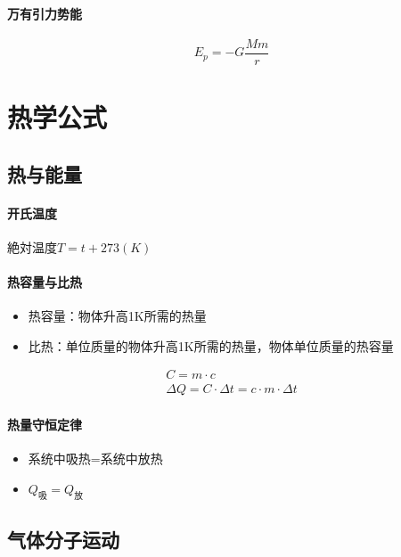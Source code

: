\paragraph{万有引力势能}
\begin{equation*}
    E_p=-G\frac{Mm}{r}
\end{equation*}

\section{热学公式}

\subsection{热与能量}

\paragraph{开氏温度}
\begin{center}
    絶対温度$T=t+273(K)$
\end{center}

\paragraph{热容量与比热}
\begin{itemize}
    \item 热容量：物体升高1K所需的热量
    \item 比热：单位质量的物体升高1K所需的热量，物体单位质量的热容量
\end{itemize}
\begin{gather*}
    C=m\cdot c\\
    \Delta Q=C\cdot\Delta t=c\cdot m\cdot\Delta t
\end{gather*}

\paragraph{热量守恒定律}
\begin{itemize}
    \item 系统中吸热=系统中放热
    \item $Q_\textrm{吸}=Q_\textrm{放}$
\end{itemize}

\subsection{气体分子运动}

